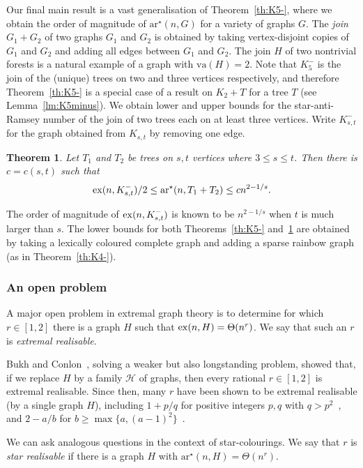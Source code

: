\documentclass[a4paper, 12pt]{article}
\numberwithin{equation}{section}
\newtheorem{theorem}{Theorem}[section]
\def\sar{{\mathrm{ar}^{\star}}}
\def\va{{\mathrm{va}}}
\newcommand{\mc}[1]{\mathcal{#1}}
\begin{document}
Our final main result is a vast generalisation of Theorem~\ref{th:K5-}, where we  obtain the order of magnitude of $\sar(n,G)$ for a variety of graphs $G$.
The \emph{join} $G_1+G_2$ of two graphs $G_1$ and $G_2$ is obtained by taking vertex-disjoint copies of $G_1$ and $G_2$ and adding
 all edges between $G_1$ and $G_2$.
The join $H$ of
 two nontrivial forests
is a natural example of a graph with $\va(H)=2$.
Note that $K_5^-$ is the join of the (unique) trees on two and three vertices respectively, and therefore Theorem~\ref{th:K5-} is a special case of a result on $K_2+T$ for a tree $T$ (see Lemma~\ref{lm:K5minus}).
We obtain lower and upper bounds for the star-anti-Ramsey number of the join of two trees each on at least three vertices.
Write $K_{s,t}^-$ for the graph obtained from $K_{s,t}$ by removing one edge.

\begin{theorem}\label{th:treejoin}
Let $T_1$ and $T_2$ be trees on $s,t$ vertices where $3 \leq s \leq t$.
Then there is $c=c(s,t)$ such that
$$
{\rm ex}(n,K_{s,t}^-)/2 \leq \sar(n,T_1 + T_2) \leq c n^{2-1/s}.
$$
\end{theorem}
The order of magnitude of ${\rm ex}(n,K_{s,t}^-)$ is known to be $n^{2-1/s}$ when $t$ is much larger than $s$.
The lower bounds for both Theorems~\ref{th:K5-} and~\ref{th:treejoin} are obtained by taking a lexically coloured complete graph and adding a sparse rainbow graph (as in Theorem~\ref{th:K4-}).



\subsubsection{An open problem}

A major open problem in extremal graph theory is to determine for which $r \in [1,2]$ there is a graph $H$ such that ${\rm ex}(n,H) = \Theta(n^r)$. We say that such an $r$ is \emph{extremal realisable}.


Bukh and Conlon~\cite{BukhConlon}, solving a weaker but also longstanding problem, showed that, if we replace $H$ by a family $\mc{H}$ of graphs, then every rational $r \in [1,2]$ is extremal realisable.
Since then, many $r$ have been shown to be extremal realisable (by a single graph $H$), including 
$1+p/q$ for positive integers $p,q$ with $q>p^2$~\cite{JiangQiu}, and $2-a/b$ for $b \geq \max\{a,(a-1)^2\}$~\cite{ConlonJanzer}.

We can ask analogous questions in the context of star-colourings.     We say that $r$ is \emph{star realisable} if there is a graph $H$ with $\sar(n,H) = \Theta(n^r)$.
 
\end{document}
